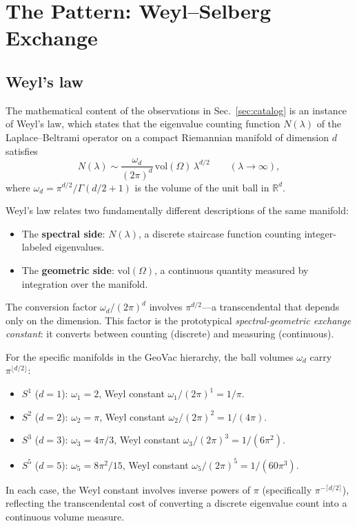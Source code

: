 \documentclass[aps,pra,twocolumn,superscriptaddress,longbibliography]{revtex4-2}
\begin{document}

\section{The Pattern: Weyl--Selberg Exchange}
\label{sec:pattern}

\subsection{Weyl's law}

The mathematical content of the observations in
Sec.~\ref{sec:catalog} is an instance of Weyl's law, which
states that the eigenvalue counting function $N(\lambda)$ of
the Laplace--Beltrami operator on a compact Riemannian manifold
of dimension $d$ satisfies~\cite{weyl1911}
\begin{equation}
  N(\lambda) \sim \frac{\omega_d}{(2\pi)^d}\,
  \mathrm{vol}(\Omega)\,\lambda^{d/2}
  \qquad (\lambda \to \infty),
  \label{eq:weyl}
\end{equation}
where $\omega_d = \pi^{d/2}/\Gamma(d/2+1)$ is the volume of
the unit ball in $\mathbb{R}^d$.

Weyl's law relates two fundamentally different descriptions
of the same manifold:
\begin{itemize}
  \item The \textbf{spectral side}: $N(\lambda)$, a discrete
    staircase function counting integer-labeled eigenvalues.
  \item The \textbf{geometric side}: $\mathrm{vol}(\Omega)$, a
    continuous quantity measured by integration over the manifold.
\end{itemize}
The conversion factor $\omega_d / (2\pi)^d$ involves
$\pi^{d/2}$---a transcendental that depends only on the
dimension.  This factor is the prototypical
\textit{spectral-geometric exchange constant}: it converts
between counting (discrete) and measuring (continuous).

For the specific manifolds in the GeoVac hierarchy, the ball
volumes $\omega_d$ carry $\pi^{\lfloor d/2 \rfloor}$:
\begin{itemize}
  \item $S^1$ ($d = 1$): $\omega_1 = 2$,
    Weyl constant $\omega_1/(2\pi)^1 = 1/\pi$.
  \item $S^2$ ($d = 2$): $\omega_2 = \pi$,
    Weyl constant $\omega_2/(2\pi)^2 = 1/(4\pi)$.
  \item $S^3$ ($d = 3$): $\omega_3 = 4\pi/3$,
    Weyl constant $\omega_3/(2\pi)^3 = 1/(6\pi^2)$.
  \item $S^5$ ($d = 5$): $\omega_5 = 8\pi^2/15$,
    Weyl constant $\omega_5/(2\pi)^5 = 1/(60\pi^3)$.
\end{itemize}
In each case, the Weyl constant involves inverse powers of $\pi$
(specifically $\pi^{-\lceil d/2 \rceil}$), reflecting the
transcendental cost of converting a discrete eigenvalue count
into a continuous volume measure.
\end{document}
